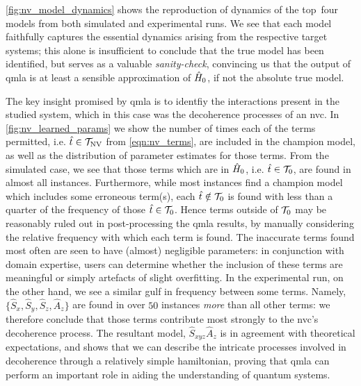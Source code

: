 \cref{fig:nv_model_dynamics} shows the reproduction of dynamics of the top\footnotemark \ 
    four \glspl{model} from both simulated and experimental \glspl{run}. 
We see that each model faithfully captures the essential dynamics arising from the respective target systems;
    this alone is insufficient to conclude that the \gls{true model} has been identified, 
    but serves as a valuable \emph{sanity-check}, convincing us that the output of \gls{qmla} is at least a sensible 
    approximation of $\hat{H}_0$, if not the absolute \gls{true model}.
\par 

The key insight promised by \gls{qmla} is to identfiy the interactions present in the studied system, 
    which in this case was the decoherence processes of an \gls{nvc}.
In \cref{fig:nv_learned_params} we show the number of times each of the terms permitted, 
    i.e. $\hat{t} \in \mathcal{T}_{\textrm{NV}}$ from \cref{eqn:nv_terms},
    are included in the \gls{champion model},
    as well as the distribution of parameter estimates for those terms. 
From the simulated case, we see that those terms which are in $\hat{H}_0$, i.e. $\hat{t} \in \mathcal{T}_0$, are found in almost all instances.
Furthermore, while most instances find a \gls{champion model} which includes some erroneous term(s), 
    each $\hat{t} \notin \mathcal{T}_0$ is found with less than a quarter of the frequency of those $\hat{t} \in \mathcal{T}_0$.
Hence terms outside of $\mathcal{T}_0$ may be reasonably ruled out in post-processing the \gls{qmla} results, 
    by manually considering the relative frequency with which each term is found. 
The inaccurate terms found most often are seen to have (almost) negligible parameters:
    in conjunction with domain expertise, users can determine whether the inclusion of these terms 
    are meaningful or simply artefacts of slight overfitting.
In the experimental \gls{run}, on the other hand, we see a similar gulf in frequency between some terms.
Namely, $\{ \hat{S}_x, \hat{S}_y, \hat{S}_z, \hat{A}_z \}$ are found in over $50$ \glspl{instance} \emph{more} than all other terms:
    we therefore conclude that those terms contribute most strongly to the \gls{nvc}'s decoherence process.
The resultant model, $\hat{S}_{xyz}\hat{A}_{z}$ is in agreement with theoretical expectations, 
    and shows that we can describe the intricate processes involved in decoherence through a relatively simple 
    \gls{hamiltonian}, proving that \gls{qmla} can perform an important role in aiding the understanding of quantum systems.  
\par 


